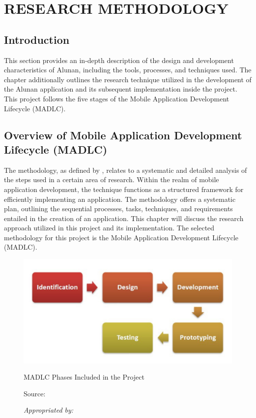 \chapter{RESEARCH METHODOLOGY}
\label{ch:method}

\section{Introduction}
This section provides an in-depth description of the design and development characteristics of Alunan, including the tools, processes, and techniques used. The chapter additionally outlines the research technique utilized in the development of the Alunan application and its subsequent implementation inside the project. This project follows the five stages of the Mobile Application Development Lifecycle (MADLC).

\section{Overview of Mobile Application Development Lifecycle (MADLC)}
The methodology, as defined by \textcite{igwenagu16}, relates to a systematic and detailed analysis of the steps used in a certain area of research. Within the realm of mobile application development, the technique functions as a structured framework for efficiently implementing an application. The methodology offers a systematic plan, outlining the sequential processes, tasks, techniques, and requirements entailed in the creation of an application. This chapter will discuss the research approach utilized in this project and its implementation. The selected methodology for this project is the Mobile Application Development Lifecycle (MADLC).

\begin{figure}[h]
    \centering
    \includegraphics[width=0.8\linewidth]{mainmatter/images/madlc1.png}
    \caption{MADLC Phases Included in the Project}
    \caption*{Source: \textcite{moharekar21}}
    \caption*{\textit{Appropriated by: \textcite{shanmugam19}}}
    \label{fig:myfig32}
\end{figure}

